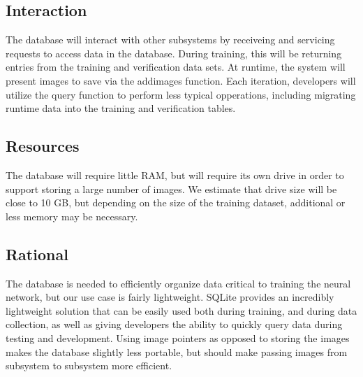 \subsection{Interaction}

The database will interact with other subsystems by receiveing and servicing requests to access data in the database. During training, this will be returning entries from the training and verification data sets. At runtime, the system will present images to save via the addimages function. Each iteration, developers will utilize the query function to perform less typical opperations, including migrating runtime data into the training and verification tables.

\subsection{Resources}

The database will require little RAM, but will require its own drive in order to support storing a large number of images. We estimate that drive size will be close to 10 GB, but depending on the size of the training dataset, additional or less memory may be necessary.

\subsection{Rational}

The database is needed to efficiently organize data critical to training the neural network, but our use case is fairly lightweight.
SQLite provides an incredibly lightweight solution that can be easily used both during training, and during data collection, as well as giving 
developers the ability to quickly query data during testing and development. 
Using image pointers as opposed to storing the images makes the database slightly less portable, but should make passing images from subsystem
to subsystem more efficient.

